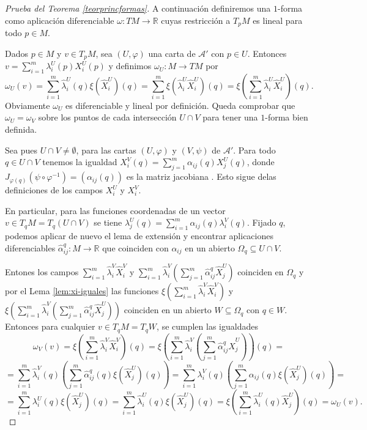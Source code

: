 \documentclass[../VD.tex]{subfiles}
\begin{document}
\begin{proof}[Prueba del Teorema \ref{teorprincformas}]
A continuación definiremos una $1$-forma como aplicación diferenciable $\omega: TM \to \mathbb{R}$ cuyas restricción a $T_p M$ es lineal para todo $p\in M$.

Dados $p\in M$ y $v\in T_pM$, sea  $(U,\varphi)$ una carta de $\mathcal{A}'$ con $p\in U$. Entonces $v = \sum_{i=1}^m \lambda^U_i(p) X^U_i(p)$ y definimos $\omega_U: M \to TM$ por   
  \[
  \omega_U(v) = \sum_{i=1}^m \widehat{\lambda}^U_i(q) \xi(\widehat{X}^U_i) (q) = \sum_{i=1}^m \xi(\widehat{\lambda}^U_i \widehat{X}^U_i)(q) = \xi(\sum_{i=1}^m \widehat{\lambda}^U_i \widehat{X}^U_i)(q) .   
  \]
Obviamente $\omega_U$ es diferenciable y lineal por definición. Queda comprobar que $\omega_U = \omega_V$ sobre los puntos de cada intersección $U\cap V$ para tener una $1$-forma bien definida. 

Sea pues $U\cap V\neq \emptyset$, para las cartas $(U,\varphi)$ y $(V,\psi)$ de $\mathcal{A}'$. Para todo $q\in U\cap V$ tenemos la igualdad $X^V_i(q) = \sum_{j=1}^m \alpha_{ij}(q) X^U_j(q)$, donde $J_{\varphi(q)}(\psi\circ \varphi^{-1}) = (\alpha_{ij}(q))$ es la matriz jacobiana  . Esto sigue delas definiciones de los campos $X^U_i$ y $X^V_i$. 

En particular, para las funciones coordenadas de un vector $v\in T_q M = T_q (U\cap V)$ se tiene 
$\lambda^U_j(q) = \sum_{i=1}^m \alpha_{ij}(q) \lambda^V_i(q)$. Fijado $q$,  podemos aplicar de nuevo el lema de extensión y encontrar aplicaciones diferenciables $\widehat{\alpha}^q_{ij}: M  \to  \mathbb{R}$ 
que coinciden con $\alpha_{ij}$ en un abierto $\Omega_q \subseteq U\cap V$.   

Entones los campos $\sum_{i= 1}^m \widehat{\lambda}^V_i \widehat{X}^V_i$ y $\sum_{i= 1}^m \widehat{\lambda}^V_i(\sum_{j=1}^m \widehat {\alpha}^q_{ij}\widehat{X}^U_j)$ coinciden en $\Omega_q$ y por el Lema \ref{lem:xi-iguales} las funciones $\xi(\sum_{i=1}^m\widehat{\lambda}^V_i\widehat{X}^V_i)$ y $\xi(\sum_{i= 1}^m \widehat{\lambda}^V_i(\sum_{j=1}^m \widehat {\alpha}^q_{ij}\widehat{X}^U_j))$ coinciden en un abierto $W\subseteq \Omega_q$ con $q\in W$. Entonces para cualquier $v\in T_q M = T_qW$, se cumplen las igualdades
\[
\omega_V(v) = \xi(\sum_{i=1}^m\widehat{\lambda}^V_i\widehat{X}^V_i)(q) = \xi(\sum_{i= 1}^m \widehat{\lambda}^V_i(\sum_{j=1}^m \widehat {\alpha}^q_{ij}\widehat{X}^U_j))(q) =
\]
\[ = \sum_{i= 1}^m \widehat{\lambda}^V_i(q)(\sum_{j=1}^m \widehat{\alpha}^q_{ij}(q)\xi(\widehat{X}^U_j)(q))
= \sum_{i= 1}^m \lambda^V_i(q)(\sum_{j=1}^m \alpha_{ij}(q) \xi(\widehat{X}^U_j)(q)) =
\]
\[= \sum_{i=1}^m \lambda^U_i(q) \xi(\widehat{X}^U_j)(q) = \sum_{i=1}^m \widehat{\lambda}^U_i(q) \xi(\widehat{X}^U_j)(q) = \xi(\sum_{i=1}^m \widehat{\lambda}^U_i(q) \widehat{X}^U_j)(q) = \omega_U(v).
\]
\end{proof}
\end{document}

